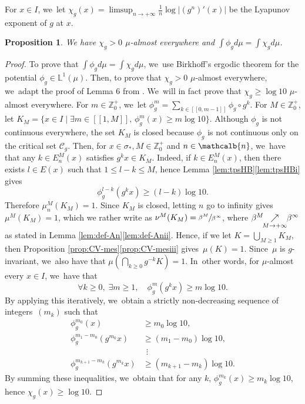 \documentclass[JEP,XML,SOM,Unicode,NoFloatCountersInSection,published]{cedram}
\newcommand{\mcbn}{{\mathcalb{n}}}
\newtheorem{prop}[thm]{Proposition}
\theoremstyle{definition}
\newcommand{\bbZ}{{\mathbb{Z}}}
\begin{document}
For $x \in I$, we~let $\chi_g(x) = \limsup_{n \to +\infty} \frac{1}{n} \log |(g^n)'(x)|$ be the Lyapunov exponent of $g$ at $x$.

\begin{prop}
\label{prop:expo-pos}
We have $\chi_g > 0$ $\mu$-almost everywhere and $\int \phi_g d \mu = \int \chi_g d \mu$.
\end{prop}

\begin{proof}
To prove that $\int \phi_g d \mu = \int \chi_g d \mu$, we~use Birkhoff's ergodic theorem for the potential $\phi_g \in \mathbb{L}^1(\mu)$.
Then, to prove that $\chi_g > 0$ $\mu$-almost everywhere, we~adapt the proof of Lemma 6 from \cite{MR4703423}. We~will in fact prove that $\chi_g \geq \log 10$ $\mu$-almost everywhere.
For $m \in \bbZ_0^+$, we~let $\phi_g^m = \sum_{k \in [\![ 0, m-1 ]\!]} \phi_g \circ g^k$.
For $M \in \bbZ_0^+$, let $K_M = \{ x \in I \mid \exists m \in [\![ 1, M ]\!],\, \phi_g^m(x) \geq m \log 10 \}$.
Although $\phi_g$ is not continuous everywhere, the set $K_M$ is closed because $\phi_g$ is not continuous only on the critical set $\mathcal{C}_g$.
Then, for $x \in \sigma_*, M \in \bbZ_0^+$ and $n \in \mcbn$, we~have that any $k \in E_n^M(x)$ satisfies $g^k x \in K_M$.
Indeed, if $k \in E_n^M(x)$, then there exists $l \in E(x)$ such that $1 \leq l-k \leq M$, hence Lemma \ref{lem:tpsHB}\eqref{lem:tpsHBi} gives
\[
\phi_g^{l-k}(g^k x) \geq (l-k) \log 10.
\]
Therefore $\mu_n^M(K_M) \!=\! 1$. Since $K_M$ is closed, letting $n$ go to infinity gives \hbox{$\mu^M(K_M) \!=\! 1$}, which we rather write as $\nu^M(K_M) = \sfrac{\beta^M}{\beta^{\infty}}$, where $\beta^M \mkern-8mu\underset{M \to +\infty}{\nearrow}\mkern-6mu\beta^{\infty}$ as stated in Lemma \ref{lem:def-An}\eqref{lem:def-Anii}.
Hence, if we let $K \!=\! \bigcup_{M \geq 1} K_M$, then Proposition \ref{prop:CV-mes}\eqref{prop:CV-mesiii} gives~\hbox{$\mu(K) \!=\! 1$}.
Since~$\mu$ is $g$-invariant, we~also have that $\mu (\bigcap_{k \geq 0} g^{-k} K) = 1$. In~other words, for $\mu$-almost every $x \in I$, we~have that
\[
\forall k \geq 0,\; \exists m \geq 1,\quad \phi_g^m(g^k x) \geq m \log 10.
\]
By applying this iteratively, we~obtain a strictly non-decreasing sequence of integers~$(m_k)$ such that
\begin{align*}
\phi_g^{m_0}(x) &\geq m_0 \log 10,\\
\phi_g^{m_1 - m_0}(g^{m_0} x) &\geq (m_1 - m_0) \log 10,\\[-5pt]
&\;\,\vdots\\[-5pt]
\phi_g^{m_{k+1} - m_k}(g^{m_k} x) &\geq (m_{k+1} - m_k) \log 10.
\end{align*}
By summing these inequalities, we~obtain that for any $k$, $\phi_g^{m_k}(x) \geq m_k \log 10$, hence $\chi_g(x) \geq \log 10$.
\end{proof}
\end{document}
